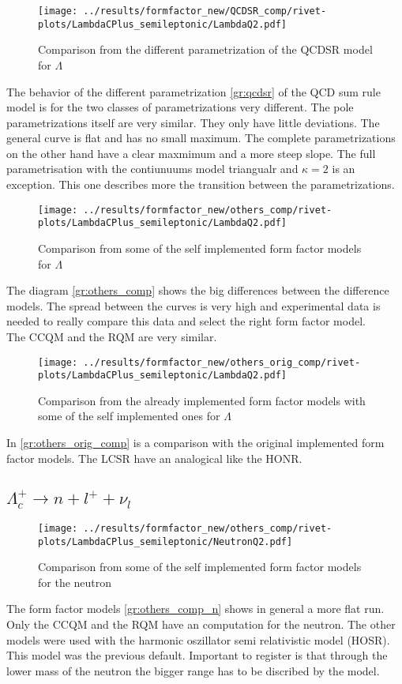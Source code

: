 \begin{figure}[h]
  \centering
  \texttt{[image: ../results/formfactor\_new/QCDSR\_comp/rivet-plots/LambdaCPlus\_semileptonic/LambdaQ2.pdf]}
  \caption{Comparison from the different parametrization of the QCDSR model for \(\Lambda\)} \label{gr:qcdsr}
\end{figure}
The behavior of the different parametrization {\eqref{gr:qcdsr}} of the QCD sum 
rule model is for the two classes of parametrizations very different. The pole 
parametrizations itself are very similar. They only have little deviations. The 
general curve is flat and has no small maximum. The complete parametrizations 
on the other hand have a clear maxmimum and a more steep slope. The full 
parametrisation with the contiunuums model triangualr and \(\kappa = 2\) is an 
exception. This one describes more the transition between the parametrizations.

\begin{figure}[h]
  \centering
  \texttt{[image: ../results/formfactor\_new/others\_comp/rivet-plots/LambdaCPlus\_semileptonic/LambdaQ2.pdf]}
  \caption{Comparison from some of the self implemented form factor models for \(\Lambda\)} \label{gr:others_comp}
\end{figure}
The diagram {\eqref{gr:others_comp}} shows the big differences between the 
difference models. The spread between the curves is very high and 
experimental data is needed to really compare this data and select the 
right form factor model.\\
The CCQM and the RQM are very similar.

\begin{figure}[h]
  \centering
  \texttt{[image: ../results/formfactor\_new/others\_orig\_comp/rivet-plots/LambdaCPlus\_semileptonic/LambdaQ2.pdf]}
  \caption{Comparison from the already implemented form factor models with 
  some of the self implemented ones for \(\Lambda\)} \label{gr:others_orig_comp}
\end{figure}
In {\eqref{gr:others_orig_comp}} is a comparison with the original implemented 
form factor models. The LCSR have an analogical like the HONR.


\clearpage
\subsection{\(\Lambda_c^+ \rightarrow n + l^+ + \nu_l\)}
\begin{figure}[h]
  \centering
  \texttt{[image: ../results/formfactor\_new/others\_comp/rivet-plots/LambdaCPlus\_semileptonic/NeutronQ2.pdf]}
  \caption{Comparison from some of the self implemented form factor models for the neutron} \label{gr:others_comp_n}
\end{figure}
The form factor models {\eqref{gr:others_comp_n}} shows in general a more 
flat run. Only the CCQM and the RQM have an computation for the neutron.
The other models were used with the harmonic oszillator semi relativistic 
model (HOSR). This model was the previous default. Important to register is that 
through the lower mass of the neutron the bigger range has to be discribed 
by the model.


